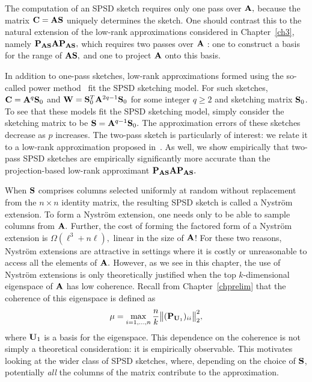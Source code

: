 The computation of an SPSD sketch requires only one pass over $\mathbf{A},$ because
the matrix $\mathbf{C} = \mathbf{A}\mathbf{S}$ uniquely determines the sketch. One should contrast this
to the natural extension of the low-rank approximations considered in Chapter~\ref{ch3},
namely $\mathbf{P}_{\mathbf{A}\mathbf{S}} \mathbf{A} \mathbf{P}_{\mathbf{A}\mathbf{S}},$ which requires two passes over
$\mathbf{A}$ : one to construct a basis for the range of $\mathbf{A}\mathbf{S},$ and one to project
$\mathbf{A}$ onto this basis. 

In addition to one-pass sketches, low-rank approximations formed using the so-called power method~\cite{HMT11}
fit the SPSD sketching model.
For such sketches, $\mathbf{C} = \mathbf{A}^q \mathbf{S}_0$ and $\mathbf{W} = \mathbf{S}_0^T \mathbf{A}^{2q-1} \mathbf{S}_0$ for some
integer $q \geq 2$ and sketching matrix $\mathbf{S}_0$. To see that these models fit the SPSD sketching model,
simply consider the sketching matrix to be $\mathbf{S} = \mathbf{A}^{q-1} \mathbf{S}_0.$ The approximation errors of these
sketches decrease as $p$ increases. The two-pass sketch is particularly of interest: we relate it to a 
low-rank approximation proposed in~\cite{HMT11}. 
As well, we show empirically that two-pass SPSD sketches are empirically significantly more accurate than the 
projection-based low-rank approximant $\mathbf{P}_{\mathbf{A} \mathbf{S}} \mathbf{A} \mathbf{P}_{\mathbf{A} \mathbf{S}}.$

When $\mathbf{S}$ comprises columns selected uniformly
at random without replacement from the $n \times n$ identity matrix, the resulting SPSD 
sketch is called a Nystr\"om extension. To form a Nystr\"om extension, 
one needs only to be able to sample columns from $\mathbf{A}.$ Further, the cost of 
forming the factored form of a Nystr\"om extension is $\Omega(\ell^3 + n\ell),$
linear in the size of $\mathbf{A}$! For these two reasons, Nystr\"om extensions are attractive in settings where it is
costly or unreasonable to access all the elements of $\mathbf{A}.$
However, as we see in this chapter, the use of Nystr\"om
extensions is only theoretically justified when the top $k$-dimensional eigenspace of $\mathbf{A}$ has
low coherence. Recall from Chapter~\ref{chprelim} that the coherence of this eigenspace is defined as
\[
 \mu = \max_{i=1,\ldots,n} \frac{n}{k} \big\|(\mathbf{P}_{\mathbf{U}_1})_{ii} \big\|_2^2,
\]
where $\mathbf{U}_1$ is a basis for the eigenspace.
This dependence on the coherence is not simply a theoretical consideration:
it is empirically observable. This motivates looking at the wider class of SPSD sketches, where, depending on the choice of $\mathbf{S}$, 
potentially \emph{all} the columns of the matrix contribute to the approximation. 

